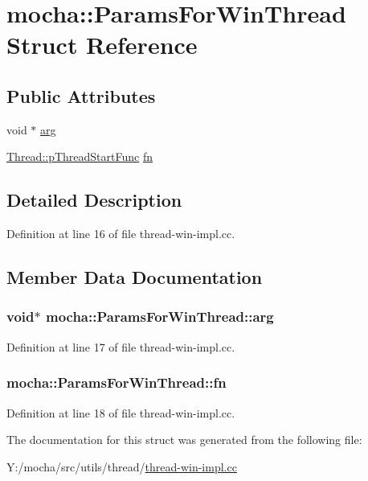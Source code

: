 \hypertarget{structmocha_1_1_params_for_win_thread}{
\section{mocha::ParamsForWinThread Struct Reference}
\label{structmocha_1_1_params_for_win_thread}
}
\subsection*{Public Attributes}
\begin{DoxyCompactItemize}
\item 
void $\ast$ \hyperlink{structmocha_1_1_params_for_win_thread_a391e0bead579168785401a606c030582}{arg}
\item 
\hyperlink{classmocha_1_1_thread_a916d7338f2a6d6ae046f89c9d46b0afa}{Thread::pThreadStartFunc} \hyperlink{structmocha_1_1_params_for_win_thread_a1156ba73cbaf0a9320b9828c381336e5}{fn}
\end{DoxyCompactItemize}


\subsection{Detailed Description}


Definition at line 16 of file thread-\/win-\/impl.cc.



\subsection{Member Data Documentation}
\hypertarget{structmocha_1_1_params_for_win_thread_a391e0bead579168785401a606c030582}{
\subsubsection[{arg}]{\setlength{\rightskip}{0pt plus 5cm}void$\ast$ {\bf mocha::ParamsForWinThread::arg}}}
\label{structmocha_1_1_params_for_win_thread_a391e0bead579168785401a606c030582}


Definition at line 17 of file thread-\/win-\/impl.cc.

\hypertarget{structmocha_1_1_params_for_win_thread_a1156ba73cbaf0a9320b9828c381336e5}{
\subsubsection[{fn}]{ {\bf mocha::ParamsForWinThread::fn}}}
\label{structmocha_1_1_params_for_win_thread_a1156ba73cbaf0a9320b9828c381336e5}


Definition at line 18 of file thread-\/win-\/impl.cc.



The documentation for this struct was generated from the following file:\begin{DoxyCompactItemize}
\item 
Y:/mocha/src/utils/thread/\hyperlink{thread-win-impl_8cc}{thread-\/win-\/impl.cc}\end{DoxyCompactItemize}
